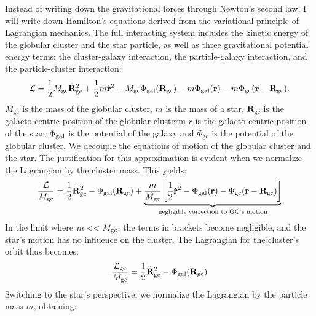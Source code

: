         Instead of writing down the gravitational forces through Newton's second law, I will write down Hamilton's equations derived from the variational principle of Lagrangian mechanics. The full interacting system includes the kinetic energy of the globular cluster and the star particle, as well as three gravitational potential energy terms: the cluster-galaxy interaction, the particle-galaxy interaction, and the particle-cluster interaction:
        \begin{equation}
            \mathcal{L} = \frac{1}{2} M_{\rm gc} \dot{\mathbf{R}}_{\rm gc}^2 
                        + \frac{1}{2} m \dot{\mathbf{r}}^2 
                        - M_{\rm gc} \Phi_{\rm gal}(\mathbf{R}_{\rm gc}) 
                        - m \Phi_{\rm gal}(\mathbf{r}) 
                        - m \Phi_{\rm gc}(\mathbf{r} - \mathbf{R}_{\rm gc}).
        \end{equation}  
        $M_{\mathrm{gc}}$ is the mass of the globular cluster, $m$ is the mass of a star, $\mathbf{R}_{\mathrm{gc}}$ is the galacto-centric position of the globular clusterm $r$ is the galacto-centric position of the star, $\Phi_{\rm gal}$ is the potential of the galaxy and $\Phi_{\mathrm{gc}}$ is the potential of the globular cluster. We decouple the equations of motion of the globular cluster and the star. The justification for this approximation is evident when we normalize the Lagrangian by the cluster mass. This yields:
        \begin{equation}
            \frac{\mathcal{L}}{M_{\rm gc}} = \frac{1}{2} \dot{\mathbf{R}}_{\rm gc}^2 
                                        - \Phi_{\rm gal}(\mathbf{R}_{\rm gc}) 
                                        + \underbrace{\frac{m}{M_{\rm gc}} \left[ \frac{1}{2} \dot{\mathbf{r}}^2 
                                        - \Phi_{\rm gal}(\mathbf{r}) 
                                        - \Phi_{\rm gc}(\mathbf{r} - \mathbf{R}_{\rm gc}) \right]}_{\text{negligible correction to GC's motion}}
        \end{equation}
        In the limit where \( m << M_{\rm gc} \), the terms in brackets become negligible, and the star's motion has no influence on the cluster. The Lagrangian for the cluster's orbit thus becomes:
        \begin{equation}
            \frac{\mathcal{L}_{\mathrm{gc}}}{M_{\mathrm{gc}}} = \frac{1}{2} \dot{\mathbf{R}}_{\rm gc}^2 
                                - \Phi_{\rm gal}(\mathbf{R}_{\rm gc})
        \end{equation}
        Switching to the star's perspective, we normalize the Lagrangian by the particle mass \( m \), obtaining:
